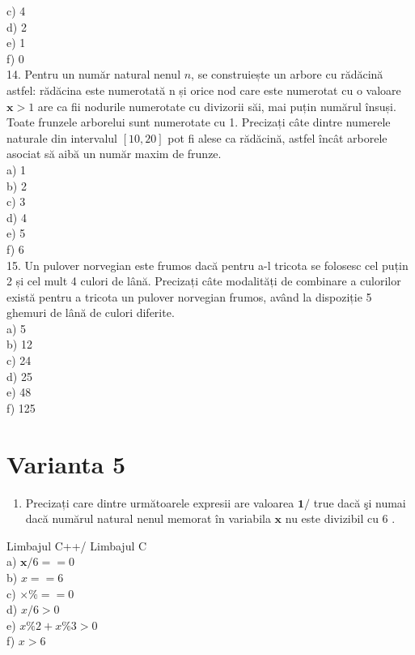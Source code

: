 c) 4\\
d) 2\\
e) 1\\
f) 0\\
14. Pentru un număr natural nenul $n$, se construiește un arbore cu rădăcină astfel: rădăcina este numerotată n și orice nod care este numerotat cu o valoare $\mathbf{x}>1$ are ca fii nodurile numerotate cu divizorii săi, mai puțin numărul însuși. Toate frunzele arborelui sunt numerotate cu 1. Precizați câte dintre numerele naturale din intervalul $[10,20]$ pot fi alese ca rădăcină, astfel încât arborele asociat să aibă un număr maxim de frunze.\\
a) 1\\
b) 2\\
c) 3\\
d) 4\\
e) 5\\
f) 6\\
15. Un pulover norvegian este frumos dacă pentru a-l tricota se folosesc cel puțin 2 și cel mult 4 culori de lână. Precizați câte modalități de combinare a culorilor există pentru a tricota un pulover norvegian frumos, având la dispoziție 5 ghemuri de lână de culori diferite.\\
a) 5\\
b) 12\\
c) 24\\
d) 25\\
e) 48\\
f) 125

\section*{Varianta 5}
\begin{enumerate}
  \item Precizați care dintre următoarele expresii are valoarea $\mathbf{1} /$ true dacă şi numai dacă numărul natural nenul memorat în variabila $\mathbf{x}$ nu este divizibil cu 6 .
\end{enumerate}

Limbajul C++/ Limbajul C\\
a) $\mathbf{x} / 6==0$\\
b) $x==6$\\
c) $\times \%==0$\\
d) $x / 6>0$\\
e) $x \% 2+x \% 3>0$\\
f) $x>6$

